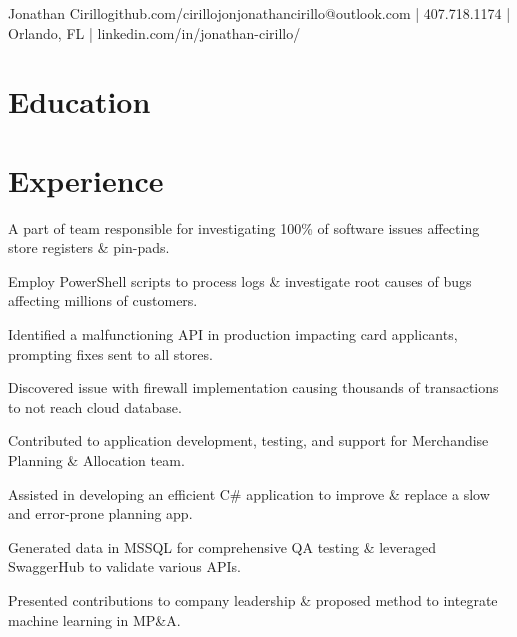 \documentclass[]{deedy-resume-openfont}
\begin{document}
%
%


\namesection \LARGE {{Jonathan} {Cirillo}}{github.com/cirillojon}{jonathancirillo@outlook.com | 407.718.1174 | Orlando, FL | linkedin.com/in/jonathan-cirillo/}

\hspace{\parindent}

\section{Education}
\sectionsep


\section{Experience}
\vspace{\topsep} 

\begin{tightemize}
\item A part of team responsible for investigating 100\% of software issues affecting store registers \& pin-pads.
\item Employ PowerShell scripts to process logs \& investigate root causes of bugs affecting millions of customers.
\item Identified a malfunctioning API in production impacting card applicants, prompting fixes
sent to all stores.
\item Discovered issue with firewall implementation causing thousands of transactions to not reach cloud database.
\end{tightemize}
\sectionsep

\begin{tightemize}
\item Contributed to application development, testing, and support for Merchandise Planning \& Allocation team.
\item  Assisted in developing an efficient C\# application to improve \& replace a slow and error-prone planning app. 
\item  Generated data in MSSQL for comprehensive QA testing \& leveraged SwaggerHub to validate various APIs.
\item Presented contributions to company leadership \& proposed method to integrate machine learning in MP\&A.

\end{tightemize}
\sectionsep
\end{document}
